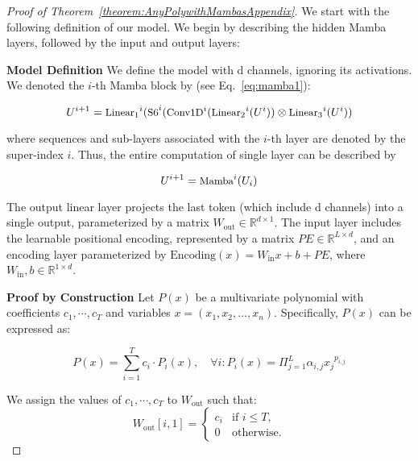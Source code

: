 \begin{proof}[Proof of Theorem~\ref{theorem:AnyPolywithMambasAppendix}]\quad
We start with the following definition of our model. We begin by describing the hidden Mamba layers, followed by the input and output layers:

\smallskip
\noindent\textbf{Model Definition\quad} We define the model with d channels, ignoring its activations. We denoted the \( i \)-th Mamba block by (see Eq.~\ref{eq:mamba1}):

\begin{equation}
    \small
    U^{i+1} = {\text{Linear}_1}^i {(\text{S6}}^i({\text{Conv1D}}^i({\text{Linear}_2}^i(U^i)) \otimes {\text{Linear}_3}^i(U^i) )
\end{equation}

where sequences and sub-layers associated with the \( i \)-th layer are denoted by the super-index \( i \). Thus, the entire computation of single layer can be described by

\begin{equation}
    \small
    U^{i+1} = \text{Mamba}^i (U_i)
\end{equation}

The output linear layer projects the last token (which include d channels) into a single output, parameterized by a matrix \( W_{\text{out}} \in \mathbb{R}^{d \times 1} \). The input layer includes the learnable positional encoding, represented by a matrix \( PE \in \mathbb{R}^{L \times d} \), and an encoding layer parameterized by \( \text{Encoding}(x) = W_{\text{in}}x + b + PE \), where \( W_{\text{in}}, b \in \mathbb{R}^{1 \times d} \).

\smallskip
\noindent\textbf{Proof by Construction\quad}
Let \( P(x) \) be a multivariate polynomial with coefficients \( c_1, \cdots, c_T \) and variables \( x = (x_1, x_2, \ldots, x_n) \). Specifically, \( P(x) \) can be expressed as:

\begin{equation}
P(x) = \sum_{i=1}^{T} c_i \cdot P_i(x), \quad \forall i: P_i (x) = \Pi_{j=1}^L \alpha_{i,j} {x_j}^{p_{i,j}}
\end{equation}

We assign the values of \( c_1, \cdots, c_T \) to \( W_{\text{out}} \) such that:
\begin{equation}
W_{\text{out}}[i,1] = 
\begin{cases} 
       c_i & \text{if } i \leq T, \\
       0 & \text{otherwise}.
\end{cases}
\end{equation}


\end{proof}
